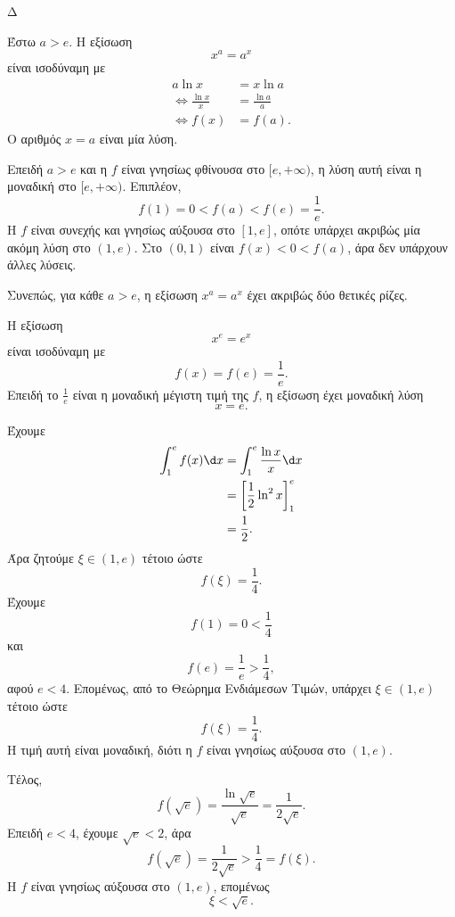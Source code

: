 \begin{thema}{Δ}
\begin{erwthma}
\item Έστω $a>e$. Η εξίσωση
\[
x^a=a^x
\]
είναι ισοδύναμη με
\begin{align*}
a\ln x&=x\ln a\\
\Leftrightarrow
\frac{\ln x}{x}&=\frac{\ln a}{a}\\
\Leftrightarrow
f(x)&=f(a).
\end{align*}
Ο αριθμός $x=a$ είναι μία λύση.

Επειδή $a>e$ και η $f$ είναι γνησίως φθίνουσα στο $[e,+\infty)$, η λύση αυτή είναι η μοναδική στο $[e,+\infty)$. Επιπλέον,
\[
f(1)=0<f(a)<f(e)=\frac{1}{e}.
\]
Η $f$ είναι συνεχής και γνησίως αύξουσα στο $[1,e]$, οπότε υπάρχει ακριβώς μία ακόμη λύση στο $(1,e)$. Στο $(0,1)$ είναι $f(x)<0<f(a)$, άρα δεν υπάρχουν άλλες λύσεις.

Συνεπώς, για κάθε $a>e$, η εξίσωση $x^a=a^x$ έχει ακριβώς δύο θετικές ρίζες.

Η εξίσωση
\[
x^e=e^x
\]
είναι ισοδύναμη με
\[
f(x)=f(e)=\frac{1}{e}.
\]
Επειδή το $\frac{1}{e}$ είναι η μοναδική μέγιστη τιμή της $f$, η εξίσωση έχει μοναδική λύση
\[
{x=e}.
\]

\item Έχουμε
\begin{align*}
\int_1^ef(x)\d x
&=\int_1^e\frac{\ln x}{x}\d x\\
&=\left[\frac{1}{2}\ln^2x\right]_1^e\\
&=\frac{1}{2}.
\end{align*}
Άρα ζητούμε $\xi\in(1,e)$ τέτοιο ώστε
\[
f(\xi)=\frac{1}{4}.
\]
Έχουμε
\[
f(1)=0<\frac{1}{4}
\]
και
\[
f(e)=\frac{1}{e}>\frac{1}{4},
\]
αφού $e<4$. Επομένως, από το Θεώρημα Ενδιάμεσων Τιμών, υπάρχει $\xi\in(1,e)$ τέτοιο ώστε
\[
f(\xi)=\frac{1}{4}.
\]
Η τιμή αυτή είναι μοναδική, διότι η $f$ είναι γνησίως αύξουσα στο $(1,e)$.

Τέλος,
\[
f(\sqrt{e})
=\frac{\ln\sqrt{e}}{\sqrt{e}}
=\frac{1}{2\sqrt{e}}.
\]
Επειδή $e<4$, έχουμε $\sqrt{e}<2$, άρα
\[
f(\sqrt{e})=\frac{1}{2\sqrt{e}}>\frac{1}{4}=f(\xi).
\]
Η $f$ είναι γνησίως αύξουσα στο $(1,e)$, επομένως
\[
{\xi<\sqrt{e}}.
\]
\end{erwthma}
\end{thema}


